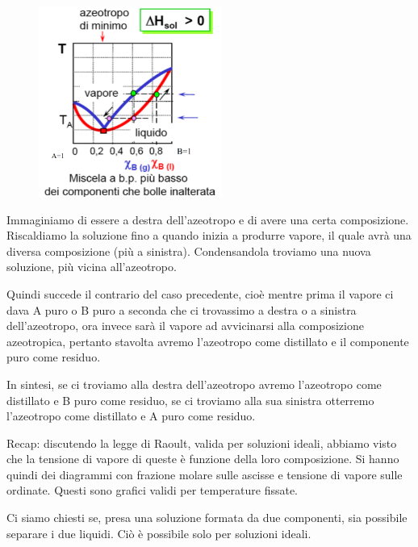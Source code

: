 \vspace{-0.2cm}\begin{minipage}{0.395\textwidth}
    \begin{figure}[H]
        \includegraphics[width=6cm]{immagini/distillazione_endotermica.png}
    \end{figure}
\end{minipage}
\begin{minipage}{0.6\textwidth}
    \vspace{0.6cm}Immaginiamo di essere a destra dell'azeotropo e di avere una certa composizione. Riscaldiamo la soluzione fino a quando inizia a produrre vapore, il quale avrà una diversa composizione (più a sinistra). Condensandola troviamo una nuova soluzione, più vicina all'azeotropo.

    Quindi succede il contrario del caso precedente, cioè mentre prima il vapore ci dava A puro o B puro a seconda che ci trovassimo a destra o a sinistra dell'azeotropo, ora invece sarà il vapore ad avvicinarsi alla composizione azeotropica, pertanto stavolta avremo l'azeotropo come distillato e il componente puro come residuo.
\end{minipage}

\vspace{0.2cm}In sintesi, se ci troviamo alla destra dell'azeotropo avremo l'azeotropo come distillato e B puro come residuo, se ci troviamo alla sua sinistra otterremo l'azeotropo come distillato e A puro come residuo.

\vspace{0.2cm}Recap: discutendo la legge di Raoult, valida per soluzioni ideali, abbiamo visto che la tensione di vapore di queste è funzione della loro composizione. Si hanno quindi dei diagrammi con frazione molare sulle ascisse e tensione di vapore sulle ordinate. Questi sono grafici validi per temperature fissate.

Ci siamo chiesti se, presa una soluzione formata da due componenti, sia possibile separare i due liquidi. Ciò è possibile solo per soluzioni ideali.

